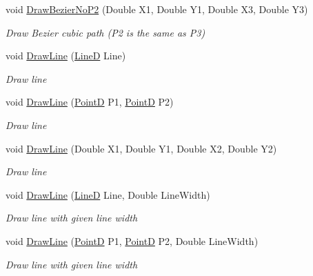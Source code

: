 \begin{DoxyCompactItemize}
void \hyperlink{class_pdf_file_writer_1_1_pdf_contents_aaad3eade246f04b8466bfad1a1e17bd5}{Draw\+Bezier\+No\+P2} (Double X1, Double Y1, Double X3, Double Y3)
\begin{DoxyCompactList}\small\item\em Draw Bezier cubic path (P2 is the same as P3) \end{DoxyCompactList}\item 
void \hyperlink{class_pdf_file_writer_1_1_pdf_contents_a985111278ea762c9fa3abe37f69a7bd0}{Draw\+Line} (\hyperlink{class_pdf_file_writer_1_1_line_d}{LineD} Line)
\begin{DoxyCompactList}\small\item\em Draw line \end{DoxyCompactList}\item 
void \hyperlink{class_pdf_file_writer_1_1_pdf_contents_ad71810d7d78a79e53af3df2a0757af10}{Draw\+Line} (\hyperlink{class_pdf_file_writer_1_1_point_d}{PointD} P1, \hyperlink{class_pdf_file_writer_1_1_point_d}{PointD} P2)
\begin{DoxyCompactList}\small\item\em Draw line \end{DoxyCompactList}\item 
void \hyperlink{class_pdf_file_writer_1_1_pdf_contents_a2f1ee17d3db95136a974503e34c6740f}{Draw\+Line} (Double X1, Double Y1, Double X2, Double Y2)
\begin{DoxyCompactList}\small\item\em Draw line \end{DoxyCompactList}\item 
void \hyperlink{class_pdf_file_writer_1_1_pdf_contents_a28ab0bef0d5ae8784463027d1d427361}{Draw\+Line} (\hyperlink{class_pdf_file_writer_1_1_line_d}{LineD} Line, Double Line\+Width)
\begin{DoxyCompactList}\small\item\em Draw line with given line width \end{DoxyCompactList}\item 
void \hyperlink{class_pdf_file_writer_1_1_pdf_contents_ab4f07f7622bd91812ef2828b6d5317b0}{Draw\+Line} (\hyperlink{class_pdf_file_writer_1_1_point_d}{PointD} P1, \hyperlink{class_pdf_file_writer_1_1_point_d}{PointD} P2, Double Line\+Width)
\begin{DoxyCompactList}\small\item\em Draw line with given line width \end{DoxyCompactList}\item 

\end{DoxyCompactItemize}
